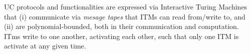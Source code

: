 UC protocols and functionalities are expressed via Interactive Turing Machines that (i) communicate via \emph{mesage tapes} that ITMs can read from/write to,
and (ii) are polynomial-bounded, both in their communication and computation.
ITms write to one another, activating each other, such that only one ITM is activate at any given time.

